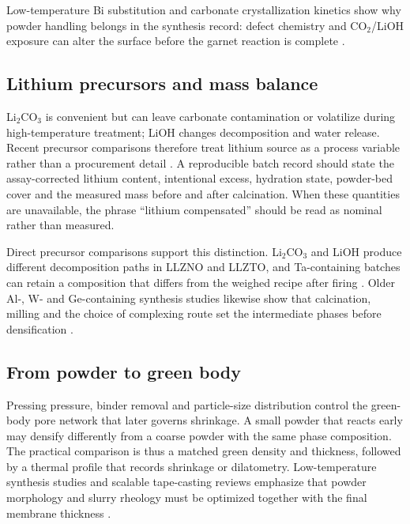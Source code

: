 Low-temperature Bi substitution and carbonate crystallization kinetics show why powder handling belongs in the synthesis record: defect chemistry and CO$_2$/LiOH exposure can alter the surface before the garnet reaction is complete \cite{schwanz2019ionic,su2026kinetics,huo2019li}.

\subsection{Lithium precursors and mass balance}

Li$_2$CO$_3$ is convenient but can leave carbonate contamination or volatilize during high-temperature treatment; LiOH changes decomposition and water release. Recent precursor comparisons therefore treat lithium source as a process variable rather than a procurement detail \cite{bae2026effect,shi2025li2co3,touidjine2024the}. A reproducible batch record should state the assay-corrected lithium content, intentional excess, hydration state, powder-bed cover and the measured mass before and after calcination. When these quantities are unavailable, the phrase “lithium compensated” should be read as nominal rather than measured.

Direct precursor comparisons support this distinction. Li$_2$CO$_3$ and LiOH produce different decomposition paths in LLZNO and LLZTO, and Ta-containing batches can retain a composition that differs from the weighed recipe after firing \cite{bae2026effect,li2025synthesis,shi2025li2co3,liu2014excess,narayanan2015effect}. Older Al-, W- and Ge-containing synthesis studies likewise show that calcination, milling and the choice of complexing route set the intermediate phases before densification \cite{jin2011al,li2015w,rosenkiewitz2014nitrogen,chen2014effect,kokal2011sol}.

\subsection{From powder to green body}

Pressing pressure, binder removal and particle-size distribution control the green-body pore network that later governs shrinkage. A small powder that reacts early may densify differently from a coarse powder with the same phase composition. The practical comparison is thus a matched green density and thickness, followed by a thermal profile that records shrinkage or dilatometry. Low-temperature synthesis studies and scalable tape-casting reviews emphasize that powder morphology and slurry rheology must be optimized together with the final membrane thickness \cite{kalita2023recent,touidjine2026tapex,gao2019preparation}.

